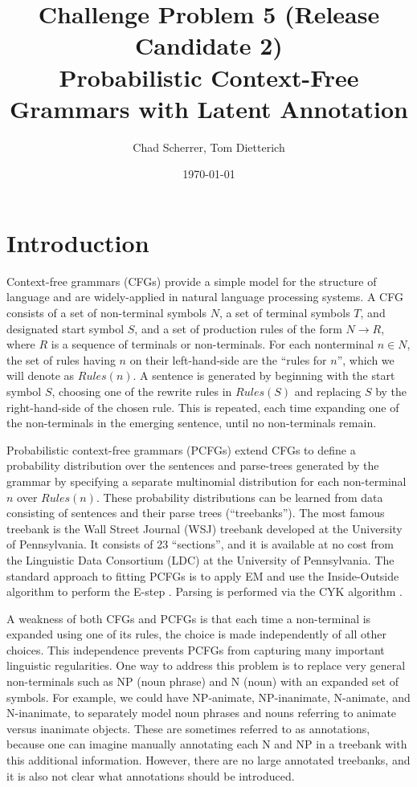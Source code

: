 \documentclass[english]{article}
\begin{document}
\title{Challenge Problem 5 (Release Candidate 2)\\
Probabilistic Context-Free Grammars with Latent Annotation}

\author{Chad Scherrer, Tom Dietterich}

\date{\today}

\maketitle

\section{Introduction}
Context-free grammars (CFGs) provide a simple model for the structure of language and are widely-applied in natural language processing systems. A CFG consists of a set of non-terminal symbols $N$, a set of terminal symbols $T$, and designated start symbol $S$, and a set of production rules of the form $N \rightarrow R$, where $R$ is a sequence of terminals or non-terminals. For each nonterminal $n \in N$, the set of rules having $n$ on their left-hand-side are the ``rules for $n$'', which we will denote as $Rules(n)$.  A sentence is generated by beginning with the start symbol $S$, choosing one of the rewrite rules in $Rules(S)$ and replacing $S$ by the right-hand-side of the chosen rule. This is repeated, each time expanding one of the non-terminals in the emerging sentence, until no non-terminals remain.

Probabilistic context-free grammars (PCFGs) extend CFGs to define a probability distribution over the sentences and parse-trees generated by the grammar by specifying a separate multinomial distribution for each non-terminal $n$ over $Rules(n)$.  These probability distributions can be learned from data consisting of sentences and their parse trees (``treebanks'').  The most famous treebank is the Wall Street Journal (WSJ) treebank developed at the University of Pennsylvania. It consists of 23 ``sections'', and it is available at no cost from the Linguistic Data Consortium (LDC) at the University of Pennsylvania. The standard approach to fitting PCFGs is to apply EM and use the Inside-Outside algorithm to perform the E-step \cite{baker1979,collins:io}. Parsing is performed via the CYK algorithm \cite{Cocke1970}. 

A weakness of both CFGs and PCFGs is that each time a non-terminal is expanded using one of its rules, the choice is made independently of all other choices. This independence prevents PCFGs from capturing many important linguistic regularities. One way to address this problem is to replace very general non-terminals such as NP (noun phrase) and N (noun) with an expanded set of symbols.  For example, we could have NP-animate, NP-inanimate, N-animate, and N-inanimate, to separately model noun phrases and nouns referring to animate versus inanimate objects. These are sometimes referred to as annotations, because one can imagine manually annotating each N and NP in a treebank with this additional information.  However, there are no large annotated treebanks, and it is also not clear what annotations should be introduced.
\end{document}
